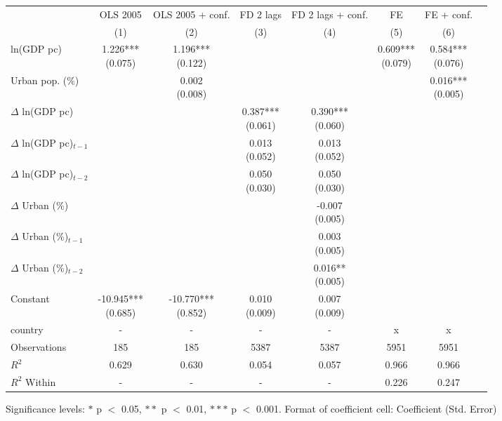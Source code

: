 \renewcommand\cellalign{t}
\begin{threeparttable}
\begin{tabular}{lccccccc}
\toprule
 & OLS 2005 & OLS 2005 + conf. & FD 2 lags & FD 2 lags + conf. & FE & FE + conf. \\
 & (1) & (2) & (3) & (4) & (5) & (6) \\
\midrule
\addlinespace
ln(GDP pc) & \makecell{1.226*** \\ (0.075)} & \makecell{1.196*** \\ (0.122)} &  &  & \makecell{0.609*** \\ (0.079)} & \makecell{0.584*** \\ (0.076)} \\
Urban pop. (\%) &  & \makecell{0.002 \\ (0.008)} &  &  &  & \makecell{0.016*** \\ (0.005)} \\
$\Delta$ ln(GDP pc) &  &  & \makecell{0.387*** \\ (0.061)} & \makecell{0.390*** \\ (0.060)} &  &  \\
$\Delta$ ln(GDP pc)$_{t-1}$ &  &  & \makecell{0.013 \\ (0.052)} & \makecell{0.013 \\ (0.052)} &  &  \\
$\Delta$ ln(GDP pc)$_{t-2}$ &  &  & \makecell{0.050 \\ (0.030)} & \makecell{0.050 \\ (0.030)} &  &  \\
$\Delta$ Urban (\%) &  &  &  & \makecell{-0.007 \\ (0.005)} &  &  \\
$\Delta$ Urban (\%)$_{t-1}$ &  &  &  & \makecell{0.003 \\ (0.005)} &  &  \\
$\Delta$ Urban (\%)$_{t-2}$ &  &  &  & \makecell{0.016** \\ (0.005)} &  &  \\
Constant & \makecell{-10.945*** \\ (0.685)} & \makecell{-10.770*** \\ (0.852)} & \makecell{0.010 \\ (0.009)} & \makecell{0.007 \\ (0.009)} &  &  \\
\midrule
\addlinespace
country & - & - & - & - & x & x \\
\midrule
\addlinespace
Observations & 185 & 185 & 5387 & 5387 & 5951 & 5951 \\
$R^2$ & 0.629 & 0.630 & 0.054 & 0.057 & 0.966 & 0.966 \\
$R^2$ Within & - & - & - & - & 0.226 & 0.247 \\
\bottomrule
\end{tabular}
\footnotesize Significance levels: $*$ p $<$ 0.05, $**$ p $<$ 0.01, $***$ p $<$ 0.001. Format of coefficient cell: Coefficient 
 (Std. Error)
\end{threeparttable}